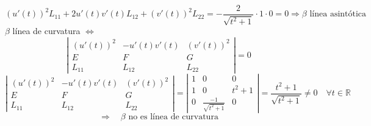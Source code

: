 \documentclass{article}
\newcommand{\R}{\mathbb{R}}
\begin{document}
$$
(u'(t))^2L_{11}+2u'(t)v'(t)L_{12}+(v'(t))^2L_{22}= - \frac{2}{\sqrt{t^2+1}}\cdot 1 \cdot 0 = 0 \Rightarrow \text{$\beta$ línea asintótica}
$$
$\beta$ línea de curvatura $\Leftrightarrow$
$$
\left|\begin{array}{ccc}
    (u'(t))^2 & -u'(t)v'(t) & (v'(t))^2 \\
    E & F & G \\
    L_{11} & L_{12} & L_{22}    
\end{array}\right| = 0
$$
$$
\left|\begin{array}{ccc}
    (u'(t))^2 & -u'(t)v'(t) & (v'(t))^2 \\
    E & F & G \\
    L_{11} & L_{12} & L_{22}    
\end{array}\right| =
\left|\begin{array}{ccc}
    1 & 0 & 0 \\
    1 & 0 & t^2+1 \\
    0 & \frac{-1}{\sqrt{t^2+1}} & 0    
\end{array}\right| = \frac{t^2+1}{\sqrt{t^2+1}} \ne 0 \quad \forall t\in \R
$$
$$
\Rightarrow \quad \text{$\beta$ no es línea de curvatura}
$$
\end{document}

